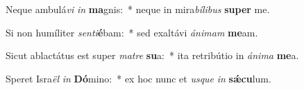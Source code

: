 \item Neque ambulá\textit{vi} \textit{in} \textbf{ma}gnis:~* neque in mira\textit{bí}\textit{li}\textit{bus} \textbf{su}\textbf{per} me.
\item Si non humíliter \textit{sen}\textit{ti}\textbf{é}bam:~* sed exaltávi \textit{á}\textit{ni}\textit{mam} \textbf{me}am.
\item Sicut ablactátus est super \textit{ma}\textit{tre} \textbf{su}a:~* ita retribútio in \textit{á}\textit{ni}\textit{ma} \textbf{me}a.
\item Speret Isra\textit{ël} \textit{in} \textbf{Dó}mino:~* ex hoc nunc et \textit{us}\textit{que} \textit{in} \textbf{sǽ}\textbf{cu}lum.
